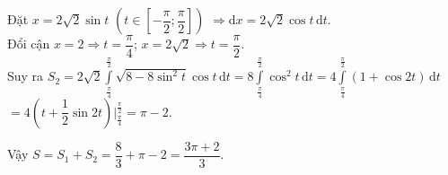 \begin{ex}
{\begin{itemize}
	 			Đặt $x=2\sqrt{2}\sin t$ $\left(t \in \left[-\dfrac{\pi}{2};\dfrac{\pi}{2}\right]\right)$ $\Rightarrow \mathrm{d}x=2\sqrt{2}\cos t\mathrm{\,d}t$.\\
	 			Đổi cận $x=2 \Rightarrow t=\dfrac{\pi}{4}$; $x=2\sqrt{2} \Rightarrow t=\dfrac{\pi}{2}$.\\
	 			Suy ra $S_2=2\sqrt{2}\displaystyle\int\limits_{\tfrac{\pi}{4}}^{\tfrac{\pi}{2}}\sqrt{8-8\sin^2t}\cos t\mathrm{\,d}t=8\displaystyle\int\limits_{\tfrac{\pi}{4}}^{\tfrac{\pi}{2}}\cos^2t\mathrm{\,d}t=4\displaystyle\int\limits_{\tfrac{\pi}{4}}^{\tfrac{\pi}{2}}(1+\cos 2t)\mathrm{\,d}t$\\
	 			\phantom{Suy ra $S_2$} $=4\left(t+\dfrac{1}{2}\sin 2t\right)\Bigg|_{\tfrac{\pi}{4}}^{\tfrac{\pi}{2}}=\pi -2$.
	 \end{itemize} 
	 Vậy $S=S_1+S_2=\dfrac{8}{3}+\pi -2=\dfrac{3\pi + 2}{3}$.
}
\end{ex}


